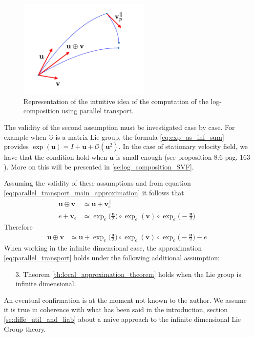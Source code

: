 \begin{figure}[htbp]
	\centering
	\includegraphics[width=6.5cm]{figures/u_plus_v_parallel_transported.pdf}
	\caption{Representation of the intuitive idea of the computation of the log-composition using parallel transport.}
	\label{fig:u_plus_v_parallel_transported}
\end{figure}
The validity of the second assumption must be investigated case by case. For example when $\mathbb{G}$ is a matrix Lie group, the formula \ref{eq:exp_as_inf_sum} provides $\exp(\mathbf{u}) = I + \mathbf{u} + \mathcal{O}(\mathbf{u}^2)$. In the case of stationary velocity field, we have that the condition hold when $\mathbf{u}$ is small enough (see proposition 8.6 pag. 163 \cite{younes2010shapes}). More on this will be presented in \ref{se:log_composition_SVF}.

Assuming the validity of these assumptions and from equation \ref{eq:parallel_transport_main_approximation} it follows that 
\begin{align*}
\mathbf{u}\oplus \mathbf{v}
&\simeq
\mathbf{u} + \mathbf{v}_{e}^{\parallel}
\\
e + \mathbf{v}_{e}^{\parallel}
&\simeq
\exp_{e}\big(\frac{\mathbf{u}}{2}\big)   
\circ  \exp_{e}(\mathbf{v}) 
\circ \exp_{e}\big(-\frac{\mathbf{u}}{2}\big)
\end{align*}
Therefore
\begin{align}\label{eq:parallel_transport}
\mathbf{u}\oplus \mathbf{v}
&\simeq
\mathbf{u} 
+
\exp_{e}\big(\frac{\mathbf{u}}{2}\big)   
\circ  \exp_{e}(\mathbf{v}) 
\circ \exp_{e}\big(-\frac{\mathbf{u}}{2}\big)
 -
 e
\end{align}
When working in the infinite dimensional case, the approximation \ref{eq:parallel_transport} holds under the following additional assumption:
\begin{enumerate}
\item[3.] Theorem \ref{th:local_approximation_theorem} holds when the Lie group is infinite dimensional.
\end{enumerate}
An eventual confirmation is at the moment not known to the author. We assume it is true in coherence with what has been said in the introduction, section \ref{se:diffe_util_and_liab} about a naive approach to the infinite dimensional Lie Group theory.

